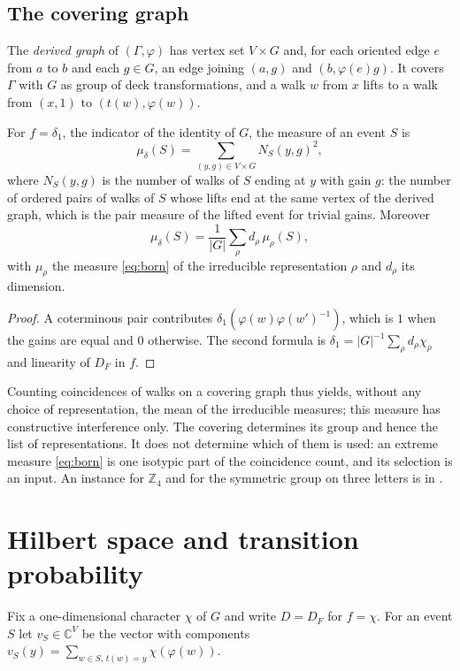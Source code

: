 \subsection{The covering graph}
The \emph{derived graph} of $(\Gamma,\varphi)$ has vertex set $V\times G$ and, for each oriented edge $e$ from $a$ to $b$ and each $g\in G$, an edge joining $(a,g)$ and $(b,\varphi(e)g)$. It covers $\Gamma$ with $G$ as group of deck transformations, and a walk $w$ from $x$ lifts to a walk from $(x,1)$ to $(t(w),\varphi(w))$.

\begin{proposition}\label{prop:cover}
For $f=\delta_1$, the indicator of the identity of $G$, the measure of an event $S$ is
\[
\mu_{\delta}(S)=\sum_{(y,g)\in V\times G}N_S(y,g)^2,
\]
where $N_S(y,g)$ is the number of walks of $S$ ending at $y$ with gain $g$: the number of ordered pairs of walks of $S$ whose lifts end at the same vertex of the derived graph, which is the pair measure of the lifted event for trivial gains. Moreover
\[
\mu_\delta(S)=\frac1{|G|}\sum_\rho d_\rho\,\mu_\rho(S),
\]
with $\mu_\rho$ the measure \eqref{eq:born} of the irreducible representation $\rho$ and $d_\rho$ its dimension.
\end{proposition}
\begin{proof}
A coterminous pair contributes $\delta_1(\varphi(w)\varphi(w')^{-1})$, which is $1$ when the gains are equal and $0$ otherwise. The second formula is $\delta_1=|G|^{-1}\sum_\rho d_\rho\chi_\rho$ \cite{serre} and linearity of $D_F$ in $f$.
\end{proof}

Counting coincidences of walks on a covering graph thus yields, without any choice of representation, the mean of the irreducible measures; this measure has constructive interference only. The covering determines its group and hence the list of representations. It does not determine which of them is used: an extreme measure \eqref{eq:born} is one isotypic part of the coincidence count, and its selection is an input. An instance for $\mathbb{Z}_4$ and for the symmetric group on three letters is in \cite{comp4}.

\section{Hilbert space and transition probability}

Fix a one-dimensional character $\chi$ of $G$ and write $D=D_F$ for $f=\chi$. For an event $S$ let $v_S\in\mathbb{C}^V$ be the vector with components $v_S(y)=\sum_{w\in S,\,t(w)=y}\chi(\varphi(w))$.

